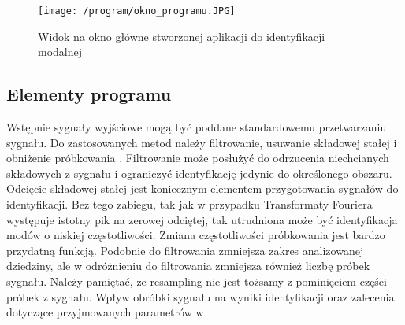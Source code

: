\begin{figure}[hbt!]
	\centering
	\texttt{[image: /program/okno\_programu.JPG]}
	\captionsetup{justification=centering}
	\caption{Widok na okno główne stworzonej aplikacji do identyfikacji modalnej}
	\label{fig: okno_programu_widok}
\end{figure}

\subsection{Elementy programu}

Wstępnie sygnały wyjściowe mogą być poddane standardowemu przetwarzaniu sygnału. Do zastosowanych metod należy filtrowanie, usuwanie składowej stałej i obniżenie próbkowania . Filtrowanie może posłużyć do odrzucenia niechcianych składowych z sygnału i ograniczyć identyfikację jedynie do określonego obszaru. Odcięcie składowej stałej jest koniecznym elementem przygotowania sygnałów do identyfikacji. Bez tego zabiegu, tak jak w przypadku Transformaty Fouriera występuje istotny pik na zerowej odciętej, tak utrudniona może być identyfikacja modów o niskiej częstotliwości. Zmiana częstotliwości próbkowania jest bardzo przydatną funkcją. Podobnie do filtrowania zmniejsza zakres analizowanej dziedziny, ale w odróżnieniu do filtrowania zmniejsza również liczbę próbek sygnału. Należy pamiętać, że resampling nie jest tożsamy z pominięciem części próbek z sygnału. Wpływ obróbki sygnału na wyniki identyfikacji oraz zalecenia dotyczące przyjmowanych parametrów  w \cite{Caicedo2011} 

